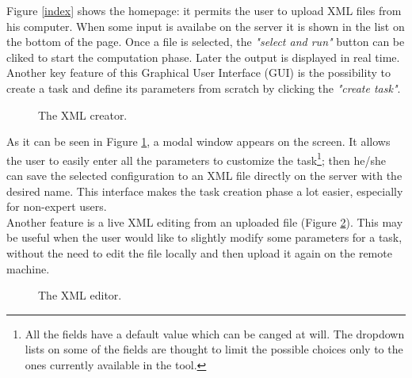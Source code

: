 Figure \ref{index} shows the homepage: it permits the user to upload XML files from his computer. When some input is availabe on the server it is shown in the list on the bottom of the page. Once a file is selected, the \emph{"select and run"} button can be cliked to start the computation phase. Later the output is displayed in real time.\\
Another key feature of this Graphical User Interface (GUI) is the possibility to create a task and define its parameters from scratch by clicking the \emph{"create task"}.

\begin{figure}[H]
  \caption{The XML creator.}
  \label{modal}
\end{figure}  

As it can be seen in Figure \ref{modal}, a modal window appears on the screen. It allows the user to easily enter all the parameters to customize the task\footnote{All the fields have a default value which can be canged at will. The dropdown lists on some of the fields are thought to limit the possible choices only to the ones currently available in the tool.}; then he/she can save the selected configuration to an XML file directly on the server with the desired name. This interface makes the task creation phase a lot easier, especially for non-expert users.\\
Another feature is a live XML editing from an uploaded file (Figure \ref{editor}). This may be useful when the user would like to slightly modify some parameters for a task, without the need to edit the file locally and then upload it again on the remote machine.

\begin{figure}[H]
  \caption{The XML editor.}
  \label{editor}
\end{figure}  